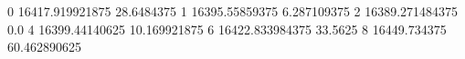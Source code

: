 0 16417.919921875 28.6484375
1 16395.55859375 6.287109375
2 16389.271484375 0.0
4 16399.44140625 10.169921875
6 16422.833984375 33.5625
8 16449.734375 60.462890625

